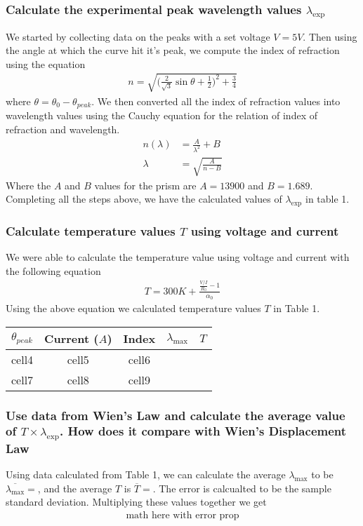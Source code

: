 \documentclass{article}
\begin{document}
\subsubsection*{Calculate the experimental peak wavelength values $\lambda_{\exp}$}
We started by collecting data on the peaks with a set voltage $V = 5V$. Then
using the angle at which the curve hit it's peak, we compute the index of refraction
using the equation
\begin{align*}
    n = \sqrt{\bigg(\frac{2}{\sqrt{3}} \sin\theta + \frac{1}{2}\bigg)^2 + \frac{3}{4}}
\end{align*}
where $\theta = \theta_0 - \theta_{peak}$. We then converted all the index of
refraction values into wavelength values using the Cauchy equation for the relation
of index of refraction and wavelength.
\begin{align*}
    n(\lambda) &= \frac{A}{\lambda^2} + B\\
    \lambda &= \sqrt{\frac{A}{n - B}}
\end{align*}
Where the $A$ and $B$ values for the prism are $A = 13900$ and $B = 1.689$. 
Completing all the steps above, we have the calculated values of $\lambda_{\exp}$
in table 1.

\subsubsection*{Calculate temperature values $T$ using voltage and current}
We were able to calculate the temperature value using voltage and current with
the following equation
\begin{align*}
    T = 300K + \frac{\frac{V / I}{R_0} - 1}{\alpha_0}
\end{align*}
Using the above equation we calculated temperature values $T$ in Table 1.

\begin{center}
    \begin{tabular}{ c | c | c | c | c}
     $\theta_{peak}$ & Current ($A$) & Index & $\lambda_{\max}$ & $T$\\
     \hline 
     cell4 & cell5 & cell6 &  &\\  
     cell7 & cell8 & cell9 &  &
    \end{tabular}
\end{center}

\newpage

\subsubsection*{Use data from Wien's Law and calculate the average value of $T\times \lambda_{\exp}$.
How does it compare with Wien's Displacement Law}
Using data calculated from Table 1, we can calculate the average $\lambda_{\max}$
to be $\overline{\lambda_{\max}} = $, and the average $T$ is $\overline{T} = $.
The error is calcualted to be the sample standard deviation. Multiplying these
values together we get
\begin{align*}
    \text{math here with error prop}
\end{align*}
\end{document}
